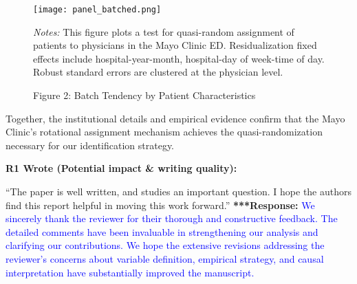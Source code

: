\documentclass[11pt]{article}
\newenvironment{quote2}
{ \bigskip
\noindent
         \small\em
         \baselineskip=14pt
}
\newcommand{\1}{\hbox{\rm 1\kern-.35em 1}}
\begin{document}
{{\begin{figure}[t]
\centering
\caption*{Figure 2: Batch Tendency by Patient Characteristics}
\begin{threeparttable}
\texttt{[image: panel\_batched.png]}
    \begin{tablenotes}
        \small
        \item \textit{Notes:} This figure plots a test for quasi-random assignment of patients to physicians in the Mayo Clinic ED. Residualization fixed effects include hospital-year-month, hospital-day of week-time of day. Robust standard errors are clustered at the physician level.
    \end{tablenotes}
\end{threeparttable}
\end{figure}


Together, the institutional details and empirical evidence confirm that the Mayo Clinic's rotational assignment mechanism achieves the quasi-randomization necessary for our identification strategy.


\color{black}



\begin{quote2}
\textbf{R1 Wrote (Potential impact \& writing quality):}

\noindent``The paper is well written, and studies an important question. I hope the authors find this report helpful in moving this work forward.” 
\end{quote2}

\noindent\textbf{***Response:} \textcolor{blue}{We sincerely thank the reviewer for their thorough and constructive feedback. The detailed comments have been invaluable in strengthening our analysis and clarifying our contributions. We hope the extensive revisions addressing the reviewer's concerns about variable definition, empirical strategy, and causal interpretation have substantially improved the manuscript.}



\clearpage


}}
\end{document}
